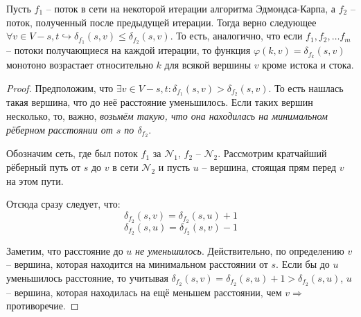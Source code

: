 \Lm[lm-ek-dist] Пусть $f_1$ -- поток в сети на некоторой итерации алгоритма Эдмондса-Карпа, а $f_2$ -- поток, полученный после предыдущей итерации.
Тогда верно следующее $\forall v \in V - s, t \hookrightarrow \delta_{f_1}(s, v) \leq \delta_{f_2}(s, v)$. 
То есть, аналогично, что если $f_1, f_2, \dots f_m$ -- потоки получающиеся на каждой итерации, то функция $\varphi(k, v) = \delta_{f_k}(s, v)$ монотоно возрастает относительно $k$ для всякой вершины $v$ кроме истока и стока.
\begin{proof}
    
    Предположим, что $\exists v \in V - s, t: \delta_{f_1}(s, v) > \delta_{f_2}(s, v)$. То есть нашлась такая вершина, что до неё расстояние уменьшилось.
    Если таких вершин несколько, то, важно, \textit{возьмём такую, что она находилась на минимальном рёберном расстоянии от $s$ по $\delta_{f_2}$}.

    Обозначим сеть, где был поток $f_1$ за $\mathcal{N}_1$, $f_2$ -- $\mathcal{N}_2$. Рассмотрим кратчайший рёберный путь от $s$ до $v$ в сети $\mathcal{N}_2$ и пусть $u$ -- вершина, стоящая прям перед $v$ на этом пути.

    \begin{figure}[h]
        \centering
    \end{figure}

    Отсюда сразу следует, что:
    \begin{equation*}
        \delta_{f_2}(s, v) = \delta_{f_2}(s, u) + 1
    \end{equation*}
    \begin{equation*}
        \delta_{f_2}(s, u) = \delta_{f_2}(s, v) - 1
    \end{equation*}
    
    Заметим, что расстояние до $u$ \textit{не уменьшилось}. Действительно, по определению $v$ -- вершина, которая находится на минимальном расстоянии от $s$. 
    Если бы до $u$ уменьшилось расстояние, то учитывая $\delta_{f_2}(s, v) = \delta_{f_2}(s, u) + 1 > \delta_{f_2}(s, u)$, $u$ -- вершина, которая находилась на ещё меньшем расстоянии, чем $v \Rightarrow$ противоречие.


\end{proof}
